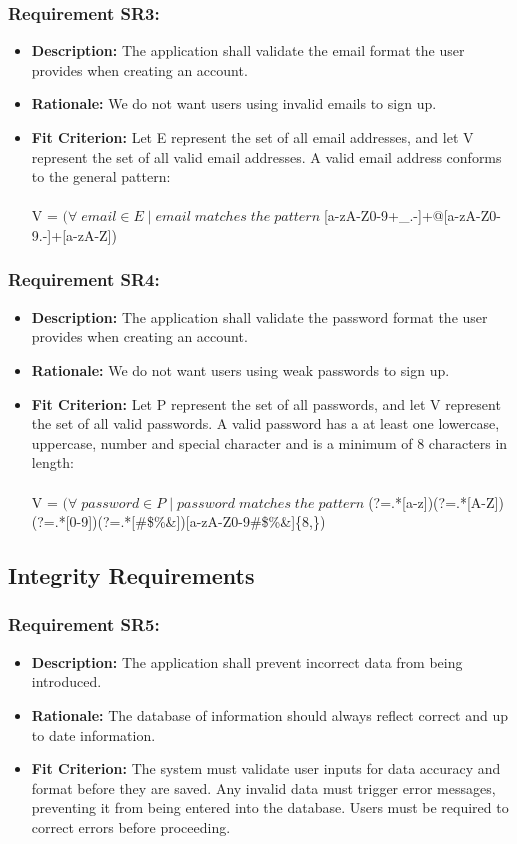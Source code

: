 \documentclass[12pt]{article}
\begin{document}
\subsubsection*{Requirement SR3:}
\begin{itemize}
  \item \textbf{Description:} The application shall validate the email format the user provides when creating an account.
  \item \textbf{Rationale:} We do not want users using invalid emails to sign up.
  \item \textbf{Fit Criterion:} Let E represent the set of all email addresses, and let V represent the set of all valid email addresses. A valid email address conforms to the general pattern:\\\\
  V = $(\forall\; email \in E\;  |\; email \; matches \; the \; pattern \; $[a-zA-Z0-9+\_.-]+@[a-zA-Z0-9.-]+[a-zA-Z])\\
\end{itemize}
\subsubsection*{Requirement SR4:}
\begin{itemize}
  \item \textbf{Description:} The application shall validate the password format the user provides when creating an account.
  \item \textbf{Rationale:} We do not want users using weak passwords to sign up.
  \item \textbf{Fit Criterion:} Let P represent the set of all passwords, and let V represent the set of all valid passwords. A valid password has a at least one lowercase, uppercase, number and special character and is a minimum of 8 characters in length:\\\\
  V = $(\forall\; password \in P\;  |\; password \; matches \; the \; pattern \; $(?=.*[a-z])(?=.*[A-Z])(?=.*[0-9])(?=.*[\#\$\%\&\*\@])[a-zA-Z0-9\#\$\%\&\*\@]\{8,\})\\
\end{itemize}
\subsection{Integrity Requirements}
\subsubsection*{Requirement SR5:}
\begin{itemize}
  \item \textbf{Description:} The application shall prevent incorrect data from being introduced.
  \item \textbf{Rationale:} The database of information should always reflect correct and up to date information.
  \item \textbf{Fit Criterion:} The system must validate user inputs for data accuracy and format before they are saved. Any invalid data must trigger error messages, preventing it from being entered into the database. Users must be required to correct errors before proceeding.
\end{itemize}
\end{document}
